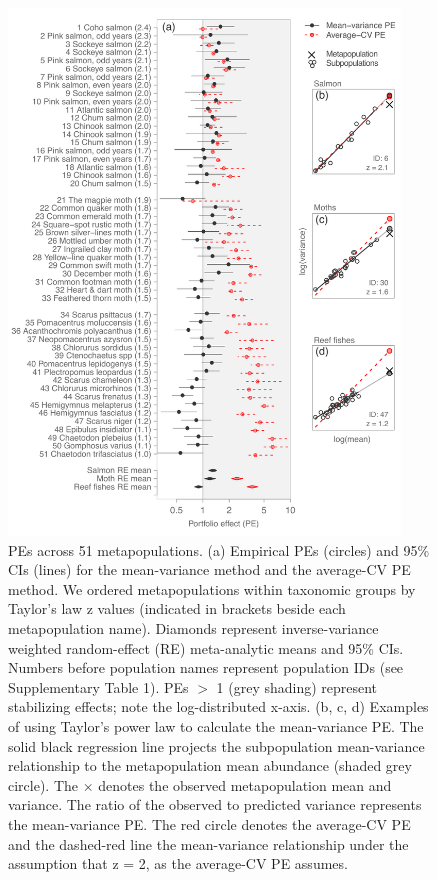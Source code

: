 \clearpage
\begin{figure}[htbp]
  \centering \includegraphics[height=5.5in]{prophets/fig3}
  \caption[PEs across 51 metapopulations.]{
  PEs across 51 metapopulations. (a) Empirical PEs (circles) and 95\%
    CIs (lines) for the mean-variance method and the average-CV PE method.
    We ordered metapopulations within taxonomic groups by Taylor's law z values
    (indicated in brackets beside each metapopulation name). Diamonds represent
    inverse-variance weighted random-effect (RE) meta-analytic means and 95\%
    CIs. Numbers before population names represent population IDs (see
    Supplementary Table 1). PEs $>$ 1 (grey shading) represent stabilizing
    effects; note the log-distributed x-axis. (b, c, d) Examples of using
    Taylor's power law to calculate the mean-variance PE. The solid black
    regression line projects the subpopulation mean-variance relationship to the
    metapopulation mean abundance (shaded grey circle). The $\times$ denotes the
    observed metapopulation mean and variance. The ratio of the observed to
    predicted variance represents the mean-variance PE. The red circle denotes
    the average-CV PE and the dashed-red line the mean-variance relationship
    under the assumption that z = 2, as the average-CV PE assumes.
  }
  \label{fig:meta}
\end{figure}
